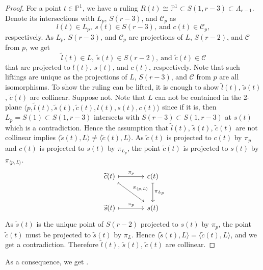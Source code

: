 \documentclass[11pt,letterpaper,reqno]{amsart}
\theoremstyle{plain}
\theoremstyle{definition}
\newtheorem{open problem}[theorem]{Open Problem}
\newtheorem{remark and notation}[theorem]{Remark and Notation}
\newtheorem{remark and definition}[theorem]{Remark and Definition}
\newtheorem{definition and notation}[theorem]{Definition and Notation}
\newtheorem{notation and convention}[theorem]{Notation and Convention}
\newtheorem{notation and remark}[theorem]{Notation and Remark}
\newtheorem{convention and notation}[theorem]{Convention and Notation}
\def \p {\mathbb{P}}
\begin{document}
\begin{proof}
    For a point $t\in \p^1$, we have a ruling $R(t)\cong \p^1\subset S(1,r-3)\subset\Lambda_{r-1}$. Denote its intersections with $L_p$, $S(r-3)$, and $\mathcal{C}_p$ as \[l(t)\in L_p,\ s(t)\in S(r-3),\ \text{and }c(t)\in \mathcal{C}_p,\] respectively.
    As $L_p$, $S(r-3)$, and $\mathcal{C}_p$ are projections of $L$, $S(r-2)$, and $\mathcal{C}$ from $p$, we get \[\widetilde{l}(t)\in L,\ \widetilde{s}(t)\in S(r-2),\ \text{and }\widetilde{c}(t)\in \mathcal{C}\] that are projected to $l(t)$, $s(t)$, and $c(t)$, respectively. Note that such liftings are unique as the projections of $L$, $S(r-3)$, and $\mathcal{C}$ from $p$ are all isomorphisms.
    To show the ruling can be lifted, it is enough to show $\widetilde{l}(t)$, $\widetilde{s}(t)$, $\widetilde{c}(t)$ are collinear.
    Suppose not. Note that $L$ can not be contained in the 2-plane $\langle p,\widetilde{l}(t),\widetilde{s}(t),\widetilde{c}(t),l(t),s(t),c(t)\rangle$ since if it is, then $L_p=S(1)\subset S(1,r-3)$ intersects with $S(r-3)\subset S(1,r-3)$ at $s(t)$ which is a contradiction.
    Hence the assumption that $\widetilde{l}(t)$, $\widetilde{s}(t)$, $\widetilde{c}(t)$ are not collinear implies $\langle \widetilde{s}(t),L\rangle \neq \langle \widetilde{c}(t),L\rangle$. As $\widetilde{c}(t)$ is projected to $c(t)$ by $\pi_p$ and $c(t)$ is projected to $s(t)$ by $\pi_{L_p}$, the point $\widetilde{c}(t)$ is projected to $s(t)$ by $\pi_{\langle p,L\rangle}$.
    \[\begin{tikzcd}[sep=large]
        \widetilde{c}(t)\arrow[r,"\pi_p",maps to]\arrow[rd,"\pi_{\langle p,L\rangle}",maps to]&c(t)\arrow[d,"\pi_{L_p}",maps to]\\
        \widetilde{s}(t)\arrow[r,"\pi_p",maps to]&s(t)
    \end{tikzcd}\]
    As $\widetilde{s}(t)$ is the unique point of $S(r-2)$ projected to $s(t)$ by $\pi_p$, the point $\widetilde{c}(t)$ must be projected to $\widetilde{s}(t)$ by $\pi_L$. Hence $\langle \widetilde{s}(t),L\rangle=\langle \widetilde{c}(t),L\rangle$, and we get a contradiction. Therefore $\widetilde{l}(t)$, $\widetilde{s}(t)$, $\widetilde{c}(t)$ are collinear.
\end{proof}

As a consequence, we get .
\end{document}
